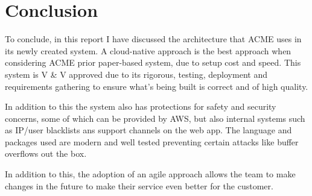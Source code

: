 \section{Conclusion}
  To conclude, in this report I have discussed the architecture that ACME uses in its newly created system. A cloud-native approach is the best 
  approach when considering ACME prior paper-based system, due to setup cost and speed. This system is V \& V approved due to its rigorous, testing,
  deployment and requirements gathering to ensure what's being built is correct and of high quality.

  In addition to this the system also has protections for safety and security concerns, some of which can be provided by AWS, but also internal systems
  such as IP/user blacklists ans support channels on the web app. The language and packages used are modern and well tested preventing certain attacks
  like buffer overflows out the box.

  In addition to this, the adoption of an agile approach allows the team to make changes in the future to make their service even better for the customer.
\newpage